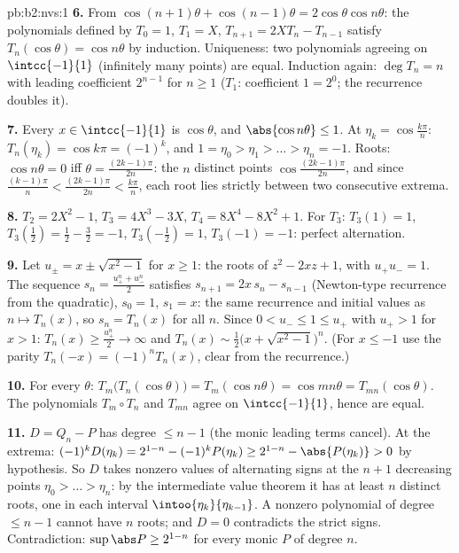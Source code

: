 \begin{solution}{pb:b2:nvs:1}
\textbf{6.} From $\cos(n{+}1)\theta + \cos(n{-}1)\theta =
2\cos\theta\cos n\theta$: the polynomials defined by $T_0 = 1$,
$T_1 = X$, $T_{n+1} = 2XT_n - T_{n-1}$ satisfy $T_n(\cos\theta)
= \cos n\theta$ by induction. Uniqueness: two polynomials
agreeing on $\intcc{-1}{1}$ (infinitely many points) are equal.
Induction again: $\deg T_n = n$ with leading coefficient
$2^{n-1}$ for $n \geq 1$ ($T_1$: coefficient $1 = 2^0$; the
recurrence doubles it).

\textbf{7.} Every $x \in \intcc{-1}{1}$ is $\cos\theta$, and
$\abs{\cos n\theta} \leq 1$. At $\eta_k = \cos\frac{k\pi}n$:
$T_n(\eta_k) = \cos k\pi = (-1)^k$, and $1 = \eta_0 > \eta_1 >
\dots > \eta_n = -1$. Roots: $\cos n\theta = 0$ iff $\theta =
\frac{(2k-1)\pi}{2n}$: the $n$ distinct points
$\cos\frac{(2k-1)\pi}{2n}$, and since $\frac{(k-1)\pi}n <
\frac{(2k-1)\pi}{2n} < \frac{k\pi}n$, each root lies strictly
between two consecutive extrema.

\textbf{8.} $T_2 = 2X^2 - 1$, $T_3 = 4X^3 - 3X$, $T_4 = 8X^4 -
8X^2 + 1$. For $T_3$: $T_3(1) = 1$, $T_3(\tfrac12) = \tfrac12 -
\tfrac32 = -1$, $T_3(-\tfrac12) = 1$, $T_3(-1) = -1$: perfect
alternation.

\textbf{9.} Let $u_\pm = x \pm \sqrt{x^2 - 1}$ for $x \geq 1$:
the roots of $z^2 - 2xz + 1$, with $u_+u_- = 1$. The sequence
$s_n = \frac{u_+^n + u_-^n}2$ satisfies $s_{n+1} = 2x\,s_n -
s_{n-1}$ (Newton-type recurrence from the quadratic), $s_0 = 1$,
$s_1 = x$: the same recurrence and initial values as $n \mapsto
T_n(x)$, so $s_n = T_n(x)$ for all $n$. Since $0 < u_- \leq 1
\leq u_+$ with $u_+ > 1$ for $x > 1$: $T_n(x) \geq
\frac{u_+^n}2 \to \infty$ and $T_n(x) \sim \frac12\bigl(x +
\sqrt{x^2-1}\bigr)^n$. (For $x \leq -1$ use the parity $T_n(-x)
= (-1)^nT_n(x)$, clear from the recurrence.)

\textbf{10.} For every $\theta$: $T_m\bigl(T_n(\cos\theta)\bigr)
= T_m(\cos n\theta) = \cos mn\theta =
T_{mn}(\cos\theta)$. The polynomials $T_m \circ T_n$ and
$T_{mn}$ agree on $\intcc{-1}{1}$, hence are equal.

\textbf{11.} $D = Q_n - P$ has degree $\leq n - 1$ (the monic
leading terms cancel). At the extrema: $(-1)^kD(\eta_k) =
2^{1-n} - (-1)^kP(\eta_k) \geq 2^{1-n} - \abs{P(\eta_k)} > 0$ by
hypothesis. So $D$ takes nonzero values of alternating signs at
the $n + 1$ decreasing points $\eta_0 > \dots > \eta_n$: by the
intermediate value theorem it has at least $n$ distinct roots,
one in each  interval $\intoo{\eta_{k}}{\eta_{k-1}}$. A
nonzero polynomial of degree $\leq n - 1$ cannot have $n$ roots;
and $D = 0$ contradicts the strict signs. Contradiction:
$\sup\abs P \geq 2^{1-n}$ for every monic $P$ of degree $n$.


\end{solution}
